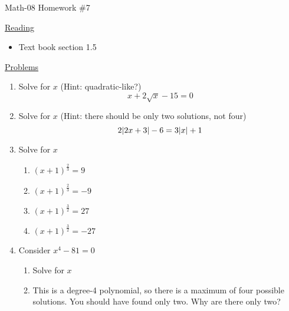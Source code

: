 \documentclass[letterpaper,12pt,fleqn]{article}
\begin{document}
\begin{center}
\Large Math-08 Homework \#7
\end{center}

\vspace{0.5in}

\underline{Reading}

\begin{itemize}
\item Text book section 1.5
\end{itemize}

\underline{Problems}

\begin{enumerate}
\item Solve for $x$ (Hint: quadratic-like?)
  \[x+2\sqrt{x}-15=0\]

\item Solve for $x$ (Hint: there should be only two solutions, not four)
  \[2\lvert2x+3\rvert-6=3\lvert x\rvert+1\]

\item Solve for $x$
  \begin{enumerate}
  \item $(x+1)^{\frac{2}{3}}=9$
  \item $(x+1)^{\frac{2}{3}}=-9$
  \item $(x+1)^{\frac{3}{2}}=27$
  \item $(x+1)^{\frac{3}{2}}=-27$
  \end{enumerate}

  \bigskip

\item Consider $x^4-81=0$
  \begin{enumerate}
  \item Solve for $x$
  \item This is a degree-4 polynomial, so there is a maximum of four possible
    solutions. You should have found only two. Why are there only two?
  \end{enumerate}
  
\end{enumerate}
  
\end{document}
